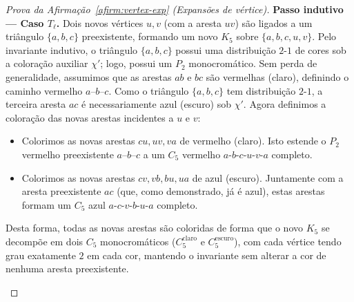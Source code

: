 \documentclass[reqno, 12pt]{amsart}
\numberwithin{equation}{section}
\theoremstyle{plain}
\theoremstyle{definition}
\begin{document}
\begin{proof}[Prova da Afirmação~\ref{afirm:vertex-exp} (Expansões de vértice)]
    \medskip\noindent\textbf{Passo indutivo --- Caso $T_\ell$.}
    Dois novos vértices $u, v$ (com a aresta $uv$) são ligados a um triângulo $\{a,b,c\}$ preexistente, formando um novo $K_5$ sobre $\{a,b,c,u,v\}$.
    Pelo invariante indutivo, o triângulo $\{a,b,c\}$ possui uma distribuição $2$-$1$ de cores sob a coloração auxiliar $\chi'$; logo, possui um $P_2$ monocromático. Sem perda de generalidade, assumimos que as arestas $ab$ e $bc$ são vermelhas (claro), definindo o caminho vermelho $a$--$b$--$c$.
    Como o triângulo $\{a,b,c\}$ tem distribuição $2$-$1$, a terceira aresta $ac$ é necessariamente azul (escuro) sob $\chi'$.
    Agora definimos a coloração das novas arestas incidentes a $u$ e $v$:
    \begin{itemize}
        \item Colorimos as novas arestas $cu, uv, va$ de vermelho (claro). Isto estende o $P_2$ vermelho preexistente $a$--$b$--$c$ a um $C_5$ vermelho $a\text{-}b\text{-}c\text{-}u\text{-}v\text{-}a$ completo.
        \item Colorimos as novas arestas $cv, vb, bu, ua$ de azul (escuro). Juntamente com a aresta preexistente $ac$ (que, como demonstrado, já é azul), estas arestas formam um $C_5$ azul $a\text{-}c\text{-}v\text{-}b\text{-}u\text{-}a$ completo.
    \end{itemize}
    Desta forma, todas as novas arestas são coloridas de forma que o novo $K_5$ se decompõe em dois $C_5$ monocromáticos ($C_5^{\text{claro}}$ e $C_5^{\text{escuro}}$), com cada vértice tendo grau exatamente $2$ em cada cor, mantendo o invariante sem alterar a cor de nenhuma aresta preexistente.

    \begin{center}
\end{center}
\end{proof}
\end{document}
